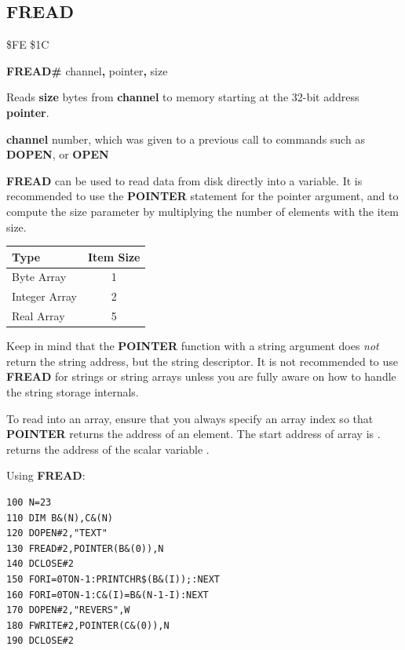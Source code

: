 \subsection{FREAD}
\begin{description}[leftmargin=2cm,style=nextline]
\item [Token:] \$FE \$1C
\item [Format:] {\bf FREAD\#} channel{\bf,} pointer{\bf,} size
\item [Usage:] Reads {\bf size} bytes from {\bf channel} to memory
               starting at the 32-bit address {\bf pointer}.

               {\bf channel} number, which was given to a previous
               call to commands such as {\bf DOPEN}, or {\bf OPEN}

               {\bf FREAD} can be used to read data from disk directly
               into a variable.
               It is recommended to use the {\bf POINTER} statement
               for the pointer argument, and to compute the size parameter
               by multiplying the number of elements with the item size.
\begin{center}
\label{freadtable}
\setlength{\tabcolsep}{1mm}
\begin{tabular}{|l|c|}
\hline
{\bf Type}          & {\bf Item Size} \\
\hline
Byte     Array &  1     \\
Integer  Array &  2     \\
Real     Array &  5     \\
\hline
\end{tabular}
\end{center}

Keep in mind that the {\bf POINTER} function with a string argument
does {\em not} return the string address, but the string descriptor.
It is not recommended to use {\bf FREAD} for strings or string arrays
unless you are fully aware on how to handle the string storage internals.

To read into an array, ensure that you always specify an array index so that {\bf
POINTER} returns the address of an element. The start address of array
 is . 
returns the address of the scalar variable .

\item [Example:] Using {\bf FREAD}:
\begin{tcolorbox}[colback=black,coltext=white]
\verbatimfont{\codefont}
\begin{verbatim}
100 N=23
110 DIM B&(N),C&(N)
120 DOPEN#2,"TEXT"
130 FREAD#2,POINTER(B&(0)),N
140 DCLOSE#2
150 FORI=0TON-1:PRINTCHR$(B&(I));:NEXT
160 FORI=0TON-1:C&(I)=B&(N-1-I):NEXT
170 DOPEN#2,"REVERS",W
180 FWRITE#2,POINTER(C&(0)),N
190 DCLOSE#2
\end{verbatim}
\end{tcolorbox}
\end{description}


